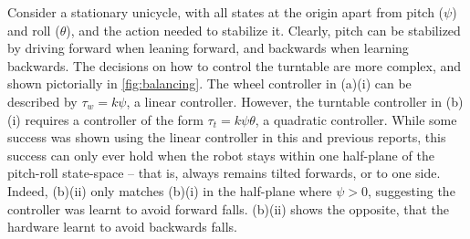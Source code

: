 \documentclass[main.tex]{subfiles}
\begin{document}
	Consider a stationary unicycle, with all states at the origin apart from pitch ($\psi$) and roll ($\theta$), and the action needed to stabilize it.
	Clearly, pitch can be stabilized by driving forward when leaning forward, and backwards when learning backwards.
	The decisions on how to control the turntable are more complex, and shown pictorially in \cref{fig:balancing}.
	The wheel controller in (a)(i) can be described by $\tau_w = k\psi$, a linear controller.
	However, the turntable controller in (b)(i) requires a controller of the form $\tau_t = k\psi\theta$, a quadratic controller.
	While some success was shown using the linear controller in this and previous reports, this success can only ever hold when the robot stays within one half-plane of the pitch-roll state-space -- that is, always remains tilted forwards, or to one side.
	Indeed, (b)(ii) only matches (b)(i) in the half-plane where $\psi > 0$, suggesting the controller was learnt to avoid forward falls. (b)(ii) shows the opposite, that the hardware learnt to avoid backwards falls.

	\newenvironment{ctrlaxis}{%
		\begin{axis}[%
			width=\linewidth,
			height=0.75\linewidth,
			scale only axis,
			xmin=-pi/2,xmax=pi/2,
			ymin=-3*pi/8,ymax=3*pi/8,
			y dir=reverse,
			xtick={-0.7853981, 0, 0.7853981},
			ytick={-0.7853981, 0, 0.7853981},
			ylabel={$\theta$},
			xlabel={$\psi$},
			xticklabels={{$-\frac{\pi}{4}$},{},{$\frac{\pi}{4}$}},
			yticklabels={{$-\frac{\pi}{4}$},{},{$\frac{\pi}{4}$}},
			axis lines=middle,
			axis on top=true,
			allow reversal of rel axis cs=false,
			y label style={anchor=south west}
		]%
	}{%
		\end{axis}%
	}
	\newcommand{\drawge}{-- (rel axis cs:1,0) -- (rel axis cs:1,1) -- (rel axis cs:0,1) \closedcycle}
	\newcommand{\drawle}{-- (rel axis cs:1,1) -- (rel axis cs:1,0) -- (rel axis cs:0,0) \closedcycle}
	\newcommand\mybox[2][]{\tikz[overlay]\node[inner sep=2pt, anchor=text, rectangle, rounded corners=1mm,#1] {#2};\phantom{#2}}


	\newlength{\ctlpadding}
	\setlength{\ctlpadding}{2em}
\end{document}
